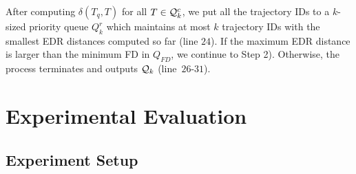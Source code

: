 \documentclass[10pt,conference,letterpaper]{IEEEtran}
\newcommand{\frname}{GAT\xspace }
\newcommand{\simq}{{{\cal Q}_k}\xspace}
\newcommand{\simcand}{{{\cal Q}_k^c}\xspace}
\newcommand{\edr}{{\delta}\xspace}
\begin{document}

After computing $\edr(T_q, T)$ for all $T\in\simcand$, we put all the trajectory IDs to a $k$-sized priority queue ${Q}_k^r$ which maintains at most $k$ trajectory IDs with the smallest EDR distances computed so far (line $24$).
If the maximum EDR distance is larger than the minimum FD in ${Q}_{FD}$, we continue to Step 2). Otherwise, the process terminates and outputs $\simq$ (line~$26$-$31$).













\section{Experimental Evaluation}\label{sec:exp}

\subsection{Experiment Setup}
\end{document}
